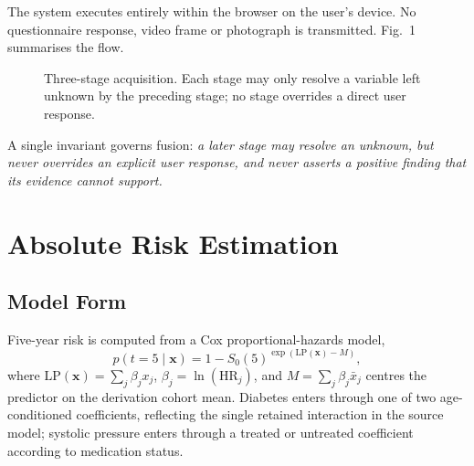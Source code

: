 \documentclass[conference]{IEEEtran}
\begin{document}
The system executes entirely within the browser on the user's device. No
questionnaire response, video frame or photograph is transmitted. Fig.~1
summarises the flow.

\begin{figure}[t]
\centering
\footnotesize
\setlength{\fboxsep}{6pt}
\caption{Three-stage acquisition. Each stage may only resolve a variable left
unknown by the preceding stage; no stage overrides a direct user response.}
\end{figure}

A single invariant governs fusion: \emph{a later stage may resolve an unknown, but
never overrides an explicit user response, and never asserts a positive finding
that its evidence cannot support.}

\section{Absolute Risk Estimation}

\subsection{Model Form}
Five-year risk is computed from a Cox proportional-hazards model,
\begin{equation}
\hat{p}(t=5 \mid \mathbf{x}) = 1 - S_0(5)^{\exp\left(\mathrm{LP}(\mathbf{x}) - M\right)},
\end{equation}
where $\mathrm{LP}(\mathbf{x}) = \sum_j \beta_j x_j$, $\beta_j = \ln(\mathrm{HR}_j)$,
and $M = \sum_j \beta_j \bar{x}_j$ centres the predictor on the derivation cohort
mean. Diabetes enters through one of two age-conditioned coefficients, reflecting
the single retained interaction in the source model; systolic pressure enters
through a treated or untreated coefficient according to medication status.
\end{document}
